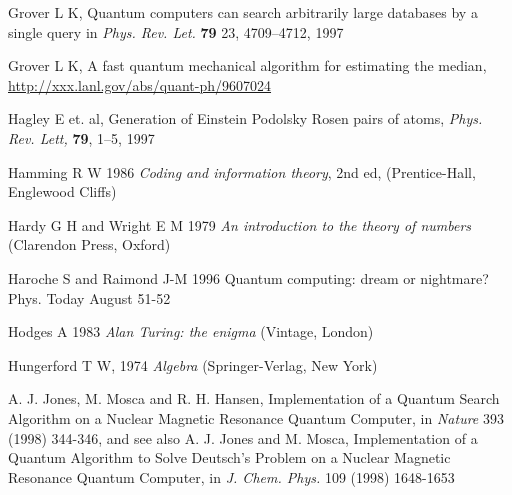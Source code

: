 \documentclass{article}
\begin{document}
\begin{thebibliography}{12}
 Grover L K,
Quantum computers can search arbitrarily large databases by a single query
in {\it Phys. Rev. Let.} {\bf 79} 23, 4709--4712, 1997


 Grover L K, 
A fast quantum mechanical algorithm for estimating the median,
\hyperref{http://xxx.lanl.gov/abs/quant-ph/9607024}{}{}
{http://xxx.lanl.gov/abs/quant-ph/9607024}

Hagley E et. al, 
Generation of Einstein Podolsky Rosen pairs of atoms, 
{\em Phys. Rev. Lett,} {\bf 79}, 1--5, 1997



Hamming R W 1986
{\em Coding and information theory}, 2nd ed,
(Prentice-Hall, Englewood Cliffs)


Hardy G H and Wright E M 1979
{\em An introduction to the theory of numbers}
(Clarendon Press, Oxford)


Haroche S and Raimond J-M 1996
Quantum computing: dream or nightmare?
Phys. Today August 51-52






Hodges A 1983
{\em Alan Turing: the enigma}
(Vintage, London)



Hungerford T W, 1974
{\em Algebra}
(Springer-Verlag, New York)
 


A. J. Jones, M. Mosca and R. H. Hansen, 
Implementation of a Quantum Search Algorithm on a Nuclear Magnetic
     Resonance Quantum Computer, in 
{\it Nature} 393 (1998) 344-346, and see also A. J. Jones and M. Mosca, 
Implementation of a Quantum Algorithm to Solve Deutsch's Problem on a
     Nuclear Magnetic Resonance Quantum Computer, 
in {\it J. Chem. Phys.} 109 (1998) 1648-1653



\end{thebibliography}
\end{document}
